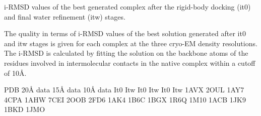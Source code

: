 \caption{i-RMSD values of the best generated complex after the rigid-body docking (it0) and final water refinement (itw) stages.}
{The quality in terms of i-RMSD values of the best solution generated after it0 and itw stages is given for each complex at the three cryo-EM density resolutions.
The i-RMSD is calculated by fitting the solution on the backbone atoms of the residues involved in intermolecular contacts in the native complex within a cutoff of 10Å. 
}
\stopbuffer


\bTABLE
\bTR \bTD[nr=2] PDB \eTD  \bTD[nc=2] 20Å data  \eTD       \bTD[nc=2] 15Å data  \eTD         \bTD[nc=2] 10Å data \eTD \eTR
\bTR \bTD It0  \eTD \bTD   Itw  \eTD \bTD   It0  \eTD \bTD   Itw  \eTD \bTD   It0  \eTD \bTD   Itw   \eTD \eTR
\bTR \bTD 1AVX \eTD {} \eTD {} \eTD {} \eTD {} \eTD {}  \eTD {} \eTD \eTR 
\bTR \bTD 2OUL \eTD {} \eTD {} \eTD {} \eTD {} \eTD {}  \eTD {} \eTD \eTR
\bTR \bTD 1AY7 \eTD {} \eTD {} \eTD {} \eTD {} \eTD {}  \eTD {} \eTD \eTR
\bTR \bTD 4CPA \eTD {} \eTD {} \eTD {} \eTD {} \eTD {}  \eTD {} \eTD \eTR
\bTR \bTD 1AHW \eTD {} \eTD {} \eTD {} \eTD {} \eTD {}  \eTD {} \eTD \eTR
\bTR \bTD 7CEI \eTD {} \eTD {} \eTD {} \eTD {} \eTD {}  \eTD {} \eTD \eTR
\bTR \bTD 2OOB \eTD {} \eTD {} \eTD {} \eTD {} \eTD {}  \eTD {} \eTD \eTR
\bTR \bTD 2FD6 \eTD {} \eTD {} \eTD {} \eTD {} \eTD {}  \eTD {} \eTD \eTR
\bTR \bTD 1AK4 \eTD {} \eTD {} \eTD {} \eTD {} \eTD {}  \eTD {} \eTD \eTR
\bTR \bTD 1B6C \eTD {} \eTD {} \eTD {} \eTD {} \eTD {}  \eTD {} \eTD \eTR
\bTR \bTD 1BGX \eTD {} \eTD {} \eTD {} \eTD {} \eTD {}  \eTD {} \eTD \eTR
\bTR \bTD 1R6Q \eTD {} \eTD {} \eTD {} \eTD {} \eTD {}  \eTD {} \eTD \eTR
\bTR \bTD 1M10 \eTD {} \eTD {} \eTD {} \eTD {} \eTD {}  \eTD {} \eTD \eTR
\bTR \bTD 1ACB \eTD {} \eTD {} \eTD {} \eTD {} \eTD {}  \eTD {} \eTD \eTR
\bTR \bTD 1JK9 \eTD {} \eTD {} \eTD {} \eTD {} \eTD {}  \eTD {} \eTD \eTR
\bTR \bTD 1BKD \eTD {} \eTD {} \eTD {} \eTD {} \eTD {}  \eTD {} \eTD \eTR
\bTR \bTD 1JMO \eTD {} \eTD {} \eTD {} \eTD {} \eTD {}  \eTD {} \eTD \eTR
\eTABLE
\stopbuffer
